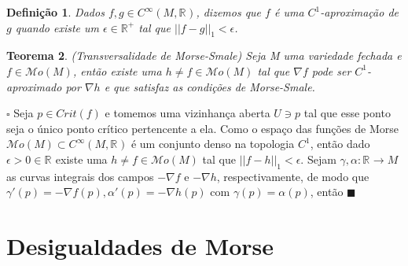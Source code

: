 \documentclass[12pt]{book}
\newtheorem{teorema}{Teorema}[section]
\newtheorem{definicao}[teorema]{Definição}
\newenvironment{prova}[1]{$\square$ #1}{\hfill$\blacksquare$}
\newcommand{\real}[1]{\mathbb{R}^{#1}}
\newcommand{\morsefunc}[1]{\mathcal{M}o(#1)}
\newcommand{\pontocritico}[1]{\textit{Crit}(#1)}
\newcommand{\suavefunc}[1]{C^{\infty}(#1, \real{})}
\begin{document}
	\begin{definicao}
		Dados $f, g \in \suavefunc{M}$, dizemos que $f$ é uma $C^{1}$-aproximação de $g$ quando existe um $\epsilon \in \real{+}$ tal que $||f-g||_{1} < \epsilon$.
	\end{definicao}
	
	\begin{teorema}
		(Transversalidade de Morse-Smale) Seja M uma variedade fechada e $f \in \morsefunc{M}$, então existe uma $h \neq f \in \morsefunc{M}$ tal que $\nabla f$ pode ser $C^{1}$-aproximado por $\nabla h$ e que satisfaz as condições de Morse-Smale.
	\end{teorema}
	\begin{prova}
		Seja $p \in \pontocritico{f}$ e tomemos uma vizinhança aberta $U \ni p$ tal que esse ponto seja o único ponto crítico pertencente a ela. Como o espaço das funções de Morse $\morsefunc{M} \subset C^{\infty}(M, \real{})$ é um conjunto denso na topologia $C^{1}$, então dado $\epsilon > 0 \in \real{}$ existe uma $h \neq f \in \morsefunc{M}$ tal que $||f-h||_{1} < \epsilon$. Sejam $\gamma, \alpha : \real{} \to M$ as curvas integrais dos campos $-\nabla f$ e $-\nabla h$, respectivamente, de modo que $\gamma'(p) = -\nabla f(p), \alpha'(p) = -\nabla h(p)$ com $\gamma(p) = \alpha(p)$, então
	\end{prova}

	\section{Desigualdades de Morse}
	
\end{document}
